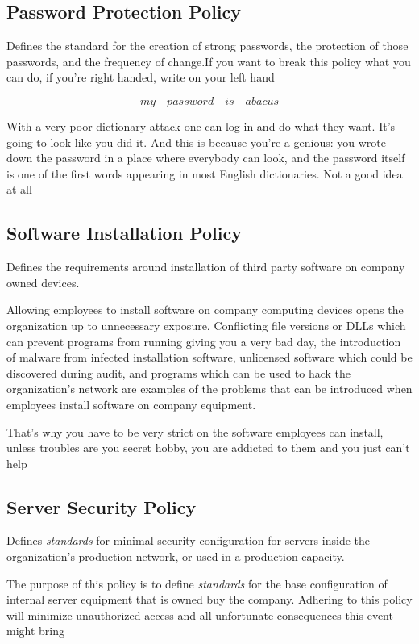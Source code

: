 \documentclass[a4paper,12pt]{article}
\begin{document}
\subsection{Password Protection Policy}
Defines the standard for the creation of strong passwords, the protection of those passwords, and the frequency of change.If you want to break this policy what you can do, if you're right handed, write on your left hand

\[ my \quad password \quad is \quad abacus \]

With a very poor dictionary attack one can log in and do what they want. It's going to look like you did it. And this is because you're a genious: you wrote down the password in a place where everybody can look, and the password itself 
is one of the first words appearing in most English dictionaries. Not a good idea at all


\subsection{Software Installation Policy}
Defines the requirements around installation of third party software on company owned devices.

Allowing employees to install software on company computing devices opens the organization up to unnecessary exposure.  Conflicting file versions or DLLs which can prevent programs from running giving you a very bad day, the introduction of malware from infected installation software, unlicensed software which could be discovered during audit, and programs which can be used to hack the organization’s network are examples of the problems that can be introduced when employees install software on company equipment.

That's why you have to be very strict on the software employees can install, unless troubles are you secret hobby, you are addicted to them and you just can't help


\subsection{Server Security Policy}

Defines \emph{standards} for minimal security configuration for servers inside the organization’s production network, or used in a production capacity.

The purpose of this policy is to define \emph{standards} for the base configuration of internal server equipment that is owned buy the company. Adhering to this policy will minimize unauthorized access and all unfortunate consequences this event might bring
 
\end{document}
